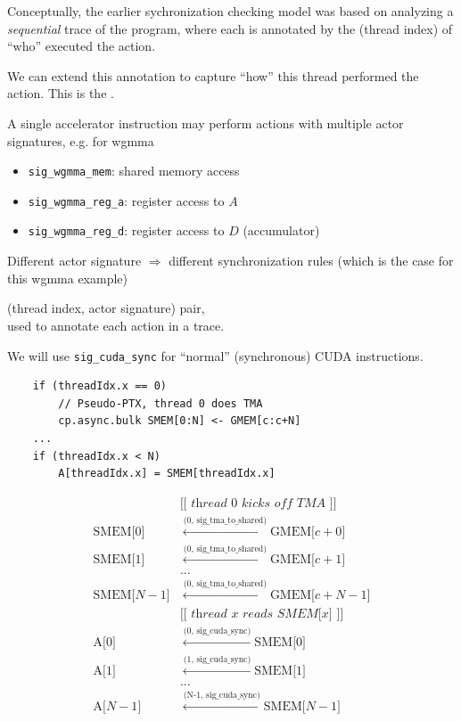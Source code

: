 \newpage
{}

\begin{minipage}[t]{0.5\textwidth}\fixminipage
Conceptually, the earlier sychronization checking model was based on analyzing a \textit{sequential} trace of the program, where each  is annotated by the  (thread index) of ``who'' executed the action.

We can extend this annotation to capture ``how'' this thread performed the action.
This is the .

A single accelerator instruction may perform actions with multiple actor signatures, e.g. for wgmma
\begin{itemize}
  \item \texttt{sig\_wgmma\_mem}: shared memory access
  \item \texttt{sig\_wgmma\_reg\_a}: register access to $A$
  \item \texttt{sig\_wgmma\_reg\_d}: register access to $D$ (accumulator)
\end{itemize}
Different actor signature $\Rightarrow$ different synchronization rules
(which is the case for this wgmma example)

 (thread index, actor signature) pair,\\
used to annotate each action in a trace.

We will use \texttt{sig\_cuda\_sync} for ``normal'' (synchronous) CUDA instructions.
\end{minipage}
\hfill
\begin{minipage}[t]{0.5\textwidth}\fixminipage
\begin{verbatim}
    if (threadIdx.x == 0)
        // Pseudo-PTX, thread 0 does TMA
        cp.async.bulk SMEM[0:N] <- GMEM[c:c+N]
    ...
    if (threadIdx.x < N)
        A[threadIdx.x] = SMEM[threadIdx.x]
\end{verbatim}

\begin{align*}
    & \textit{[[ thread 0 kicks off TMA ]]} \\
    \text{SMEM[$0$]} & \xleftarrow{\text{(0, sig\_tma\_to\_shared)}} \text{GMEM[$c+0$]} \\
    \text{SMEM[$1$]} & \xleftarrow{\text{(0, sig\_tma\_to\_shared)}} \text{GMEM[$c+1$]} \\
    & ... \\
    \text{SMEM[$N-1$]} & \xleftarrow{\text{(0, sig\_tma\_to\_shared)}} \text{GMEM[$c+N-1$]} \\
    & \textit{[[ thread $x$ reads SMEM[$x$] ]]} \\
    \text{A[$0$]} & \xleftarrow{\text{(0, sig\_cuda\_sync)}} \text{SMEM[$0$]} \\
    \text{A[$1$]} & \xleftarrow{\text{(1, sig\_cuda\_sync)}} \text{SMEM[$1$]} \\
    & ... \\
    \text{A[$N-1$]} & \xleftarrow{\text{(N-1, sig\_cuda\_sync)}} \text{SMEM[$N-1$]} \\
\end{align*}
\end{minipage}

